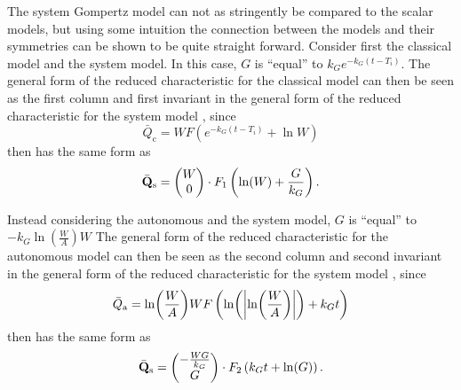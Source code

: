 The system Gompertz model can not as stringently be compared to the scalar models, but using some intuition the connection between the models and their symmetries can be shown to be quite straight forward.
Consider first the classical model and the system model.
In this case, \(G\) is \enquote{equal} to \(k_G e^{-k_G (t - T_i)}\).
The general form of the reduced characteristic for the classical model  can then be seen as the first column and first invariant in the general form of the reduced characteristic for the system model , since
\begin{equation}
  \bar{Q}_{\text{c}} = W F\left(e^{-k_G (t - T_i)} + \ln{W}\right)
\end{equation}
then has the same form as
\begin{equation}
  \bar{\vb{Q}}_{\text{s}} =
  \begin{pmatrix}
    W \\
    0
  \end{pmatrix}
  \cdot F_1\left(\ln(W) + \frac{G}{k_G}\right).
\end{equation}

Instead considering the autonomous and the system model, \(G\) is \enquote{equal} to \(-k_G \ln(\frac{W}{A}) W\)
The general form of the reduced characteristic for the autonomous model  can then be seen as the second column and second invariant in the general form of the reduced characteristic for the system model , since
\begin{equation}
  \bar{Q}_{\text{a}} = \ln(\frac{W}{A}) W F\left(\ln(\abs{\ln(\frac{W}{A})}) + k_G t\right)
\end{equation}
then has the same form as
\begin{equation}
  \bar{\vb{Q}}_{\text{s}} =
  \begin{pmatrix}
    - \frac{W G}{k_G} \\
    G
  \end{pmatrix}
  \cdot F_2\left(k_G t + \ln(G)\right).
\end{equation}